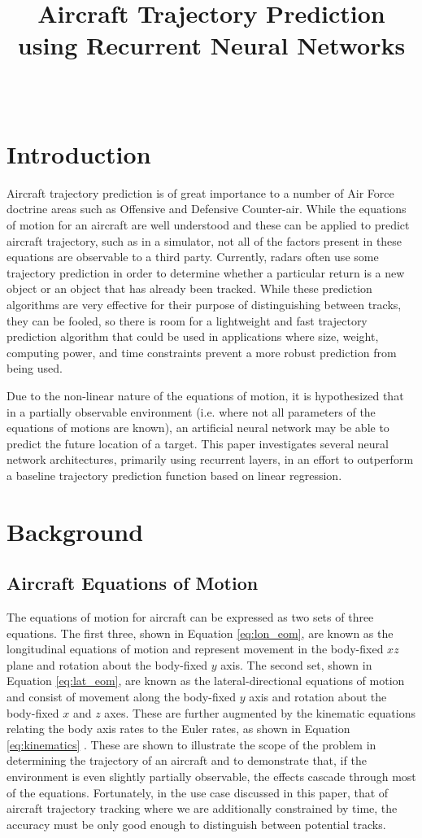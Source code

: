 \documentclass[10pt]{IEEEtran}
\title{Aircraft Trajectory Prediction using Recurrent Neural Networks}
\author{\IEEEauthorblockN{Capt Justin Merrick}\\
\IEEEauthorblockA{\textit{Dept. of Aeronautics and Astronautics}\\
\textit{Air Force Institute of Technology}\\
WPAFB, OH\\
justin.merrick@afit.edu
}}
\begin{document}
\maketitle
\section{Introduction}
Aircraft trajectory prediction is of great importance to a number of Air Force doctrine areas such as Offensive and Defensive Counter-air. While the equations of motion for an aircraft are well understood and these can be applied to predict aircraft trajectory, such as in a simulator, not all of the factors present in these equations are observable to a third party. Currently, radars often use some trajectory prediction in order to determine whether a particular return is a new object or an object that has already been tracked. While these prediction algorithms are very effective for their purpose of distinguishing between tracks, they can be fooled, so there is room for a lightweight and fast trajectory prediction algorithm that could be used in applications where size, weight, computing power, and time constraints prevent a more robust prediction from being used.

Due to the non-linear nature of the equations of motion, it is hypothesized that in a partially observable environment (i.e. where not all parameters of the equations of motions are known), an artificial neural network may be able to predict the future location of a target. This paper investigates several neural network architectures, primarily using recurrent layers, in an effort to outperform a baseline trajectory prediction function based on linear regression.

\section{Background}
\subsection{Aircraft Equations of Motion}
The equations of motion for aircraft can be expressed as two sets of three equations. The first three, shown in Equation \ref{eq:lon_eom}, are known as the longitudinal equations of motion and represent movement in the body-fixed $xz$ plane and rotation about the body-fixed $y$ axis. The second set, shown in Equation \ref{eq:lat_eom}, are known as the lateral-directional equations of motion and consist of movement along the body-fixed $y$ axis and rotation about the body-fixed $x$ and $z$ axes. These are further augmented by the kinematic equations relating the body axis rates to the Euler rates, as shown in Equation \ref{eq:kinematics} \cite{Yechout}. These are shown to illustrate the scope of the problem in determining the trajectory of an aircraft and to demonstrate that, if the environment is even slightly partially observable, the effects cascade through most of the equations. Fortunately, in the use case discussed in this paper, that of aircraft trajectory tracking where we are additionally constrained by time, the accuracy must be only good enough to distinguish between potential tracks.
\end{document}
